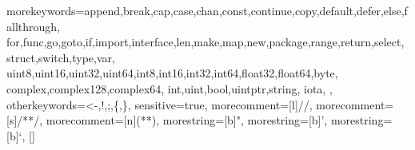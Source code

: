 \nobibintoc
\renewcommand*{\indexmark}{%
\markboth{\myfamily \typename{} \thechapter: \indexname}{\myfamily\indexname}%
}

\onecolindexfalse  %
\noindexintoc
\makeindex

\newcommand{\qquote}{{\scalefont{4.00}{``}}}
\expandafter\def\expandafter\quote\expandafter{\quote\em}


  {morekeywords={append,break,cap,case,chan,const,continue,copy,default,defer,else,fallthrough,%
  for,func,go,goto,if,import,interface,len,make,map,new,package,range,return,select,%
  struct,switch,type,var,%
  uint8,uint16,uint32,uint64,int8,int16,int32,int64,float32,float64,byte,%
  complex,complex128,complex64,%
  int,uint,bool,uintptr,string,%
  iota,%
  },%
  otherkeywords={<-,!,;,\{,\}},%
    sensitive=true,%
    morecomment=[l]{//},%
    morecomment=[s]{/*}{*/},%
    morecomment=[n]{(*}{*)},%
    morestring=[b]",%
    morestring=[b]',%
    morestring=[b]`,%
  }[]%
\lstset{language=Go,inputencoding=utf8,extendedchars=false,texcl,escapechar=\|,basicstyle=\ttfamily,keywordstyle=\bfseries,numbers=none,numberblanklines=false,showstringspaces=false,breaklines=true,numberstyle=\small\ttfamily,xleftmargin=\parindent,xrightmargin=1em,linewidth=0.98\linewidth}

\newcommand{\coderemark}[1]{\qquad$\leftarrow \textit{\small #1}$}


\renewcommand{\ExerciseHeaderTitle}{\ExerciseTitle}
\renewcommand{\ExerciseHeaderLabel}{}
\renewcommand{\ExerciseName}{}	%
\renewcommand{\ExerciseHeaderNB}{\theExercise}
\renewcommand{\ExerciseHeader}{\vspace{.7ex}\noindent\textbf{Q\theExercise}. (\number\ExerciseDifficulty) \ExerciseTitle\quad%
\addcontentsline{ex}{exercise}{\numberline{\theExercise}(\number\ExerciseDifficulty) \ExerciseTitle}}
\renewcommand{\AnswerHeader}{\vspace{.7ex}\noindent\textbf{A\theExercise}.  (\number\ExerciseDifficulty) \ExerciseTitle\quad}

